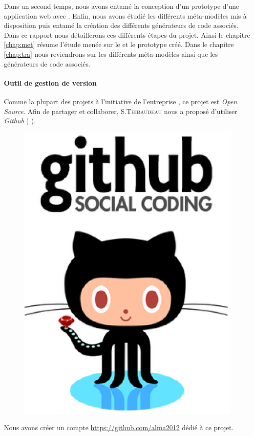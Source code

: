 Dans un second temps, nous avons entamé la conception d'un prototype d'une application web avec \kwplay{}. Enfin, nous avons étudié les différents méta-modèles mis à disposition puis entamé la création des différents générateurs de code associés. Dans ce rapport nous détaillerons ces différents étapes du projet. Ainsi le chapitre \ref{chap:met} résume l'étude menée sur le \kwplay{} et le prototype créé. Dans le chapitre \ref{chap:tra} nous reviendrons sur les différents méta-modèles ainsi que les générateurs de code associés. 

\paragraph{Outil de gestion de version}


Comme la plupart des projets à l'initiative de l'entreprise \kwobeo, ce projet est \textit{Open Source}. Afin de partager et collaborer, S.\textsc{Thibaudeau} nous a proposé d'utiliser \emph{Github} (\cf{} \cite{git}).%
\begin{figure}[htb]
  \centering
  \includegraphics[scale=.3]{img/git.eps}
\end{figure}
Nous avons créer un compte \href{alma2012}{https://github.com/alma2012} dédié à ce projet.



